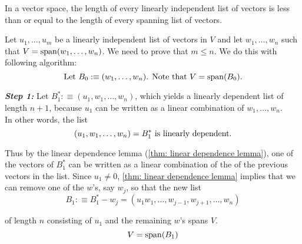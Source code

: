 \begin{thm}  
  \label{thm: length of linearly dependent list less or equal to length of spanning list}
  In a \fd vector space, the length of every linearly independent list of vectors is less than or equal to the length of every spanning list of vectors.
\end{thm}
\begin{prf}
  Let $u_1, \ldots, u_m$ be a linearly independent list of vectors in $V$ and let $w_1, \ldots, w_n$ such that $V=\operatorname{span} (w_1, \ldots, w_n)$. We need to prove that $m \leq n$. We do this with following algorithm: 
  \begin{equation*}
      $Let $B_0 :\equiv  (w_1, \ldots, w_n)$. Note that $V=\myspan{B_0}.
  \end{equation*}
  
  \emph{\bfseries Step 1:} Let $B_1^* :\equiv (u_1, w_1, \ldots, w_n)$, which yields a linearly dependent list of length $n+1$, because $u_1$ can be written as a linear combination of $w_1, \ldots, w_n$. \\
  In other words, the list
  \begin{equation*}
    (u_1, w_1, \ldots, w_n) = B_1^* $ is linearly dependent.$
  \end{equation*}
  
  Thus by the linear dependence lemma (\ref{thm: linear dependence lemma}), one of the vectors of $B_1^*$ can be written as a linear combination of the of the previous vectors in the list. Since $u_1 \neq 0$, \ref{thm: linear dependence lemma} implies that we can remove one of the $w$'s, say $w_j$, so that the new list 
  \begin{equation*}
    B_1 :\equiv B_1^* - {w_j} = (u_1 w_1, \ldots, w_{j-1}, w_{j+1}, \ldots, w_n)
  \end{equation*}
  
  of length $n$ consisting of $u_1$ and the remaining $w$'s spans $V$. 
  \begin{equation*}
    V=\operatorname{span} (B_1)
  \end{equation*}
  

\end{prf}
